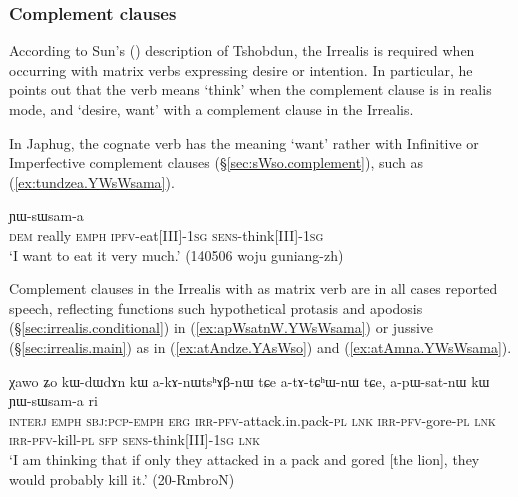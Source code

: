 \subsubsection{Complement clauses} \label{sec:irrealis.complement.clauses}
  
According to Sun's (\citeyear[807]{jackson07irrealis}) description of Tshobdun, the Irrealis is required when occurring with matrix verbs expressing desire or intention. In particular, he points out that the verb  means `think' when the complement clause is in realis mode, and `desire, want' with a complement clause in the Irrealis.

In Japhug, the cognate verb  has the meaning `want' rather with Infinitive or Imperfective complement clauses (§\ref{sec:sWso.complement}), such as (\ref{ex:tundzea.YWsWsama}).

\begin{exe}
\ex \label{ex:tundzea.YWsWsama}
 ɲɯ-sɯsam-a \\
\textsc{dem} really \textsc{emph} \textsc{ipfv}-eat[III]-\textsc{1sg} \textsc{sens}-think[III]-\textsc{1sg} \\
\glt `I want to eat it very much.' (140506 woju guniang-zh)
\end{exe}

Complement clauses in the Irrealis with  as matrix verb are in all cases reported speech, reflecting functions such  hypothetical protasis and apodosis (§\ref{sec:irrealis.conditional}) in (\ref{ex:apWsatnW.YWsWsama}) or jussive (§\ref{sec:irrealis.main}) as in (\ref{ex:atAndze.YAsWso}) and (\ref{ex:atAmna.YWsWsama}). 

\begin{exe}
\ex \label{ex:apWsatnW.YWsWsama}
\gll  χawo ʑo kɯ-dɯ\redp{}dɤn kɯ a-kɤ-nɯtsʰɤβ-nɯ tɕe a-tɤ-tɕʰɯ-nɯ tɕe, a-pɯ-sat-nɯ kɯ ɲɯ-sɯsam-a ri \\
\textsc{interj} \textsc{emph} \textsc{sbj}:\textsc{pcp}-\textsc{emph}\redp{} \textsc{erg} \textsc{irr}-\textsc{pfv}-attack.in.pack-\textsc{pl} \textsc{lnk} \textsc{irr}-\textsc{pfv}-gore-\textsc{pl} \textsc{lnk} \textsc{irr}-\textsc{pfv}-kill-\textsc{pl} \textsc{sfp} \textsc{sens}-think[III]-\textsc{1sg} \textsc{lnk} \\
\glt `I am thinking that if only they attacked in a pack and gored [the lion], they would probably kill it.' (20-RmbroN) 
\end{exe}

